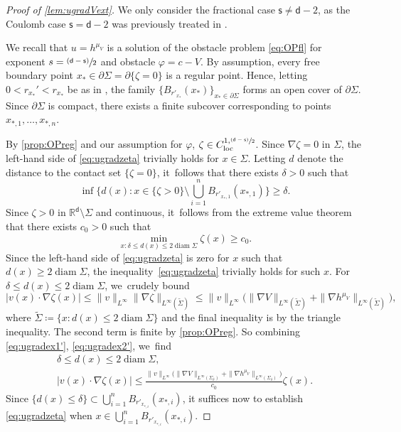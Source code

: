 \documentclass[JEP,XML,SOM,Unicode,published]{cedram}
\newcommand{\psfrac}[2]{\sfrac{(#1)}{#2}}
\newcommand{\loc}{\textup{loc}}
\theoremstyle{plain}
\theoremstyle{definition}
\DeclareMathOperator{\diam}{diam}
\newcommand{\R}{{\mathbb{R}}}
\let\nab\nabla
\let\p\partial
\let\tl\tilde
\renewcommand{\d}{\mathsf{d}}
\newcommand{\s}{\mathsf{s}}
\begin{document}
\begin{proof}[Proof of \cref{lem:ugradVext}]
We only consider the fractional case $\s\ne \d-2$, as the Coulomb case $\s=\d-2$ was previously treated in \cite[Lem.\,3.2]{BCGM2015}.

We recall that $u=h^{\mu_V}$ is a solution of the obstacle problem \eqref{eq:OPfl} for exponent ${s}=\psfrac{\d-\s}{2}$ and obstacle $\varphi=c-V$. By assumption, every free boundary point $x_*\in \p\Sigma = \p\{\zeta =0\}$ is a regular point. Hence, letting $0<r_{x_*}' < r_{x_*}$ be as in , the family $\{B_{r'_{x_*}}(x_*)\}_{x_*\in \p\Sigma}$ forms an open cover of $\p\Sigma$. Since $\p\Sigma$ is compact, there exists a finite subcover corresponding to points $x_{*,1},\ldots,x_{*,n}$.

By \cref{prop:OPreg} and our assumption for $\varphi$, $\zeta\in C_{\loc}^{1,\psfrac{\d-\s}{2}}$. Since $\nab\zeta = 0$ in $\Sigma$, the left-hand side of \eqref{eq:ugradzeta} trivially holds for $x\in\Sigma$. Letting $d$ denote the distance to the contact set $\{\zeta =0\}$, it~follows that there exists $\delta>0$ such that
\[\textstyle
\inf\bigl\{ d(x) : x \in \{\zeta > 0\} \setminus \bigcup_{i=1}^n B_{r'_{x_*,1}}(x_{*,1})\bigr\} \ge \delta.
\]
Since $\zeta>0$ in $\R^\d\setminus\Sigma$ and continuous, it~follows from the extreme value theorem that there exists $c_0>0$ such that
\begin{equation}\label{eq:ugradex1'}
\min_{x : \delta \le d(x) \le 2\diam\Sigma} \zeta(x) \ge c_0.
\end{equation}
Since the left-hand side of \eqref{eq:ugradzeta} is zero for $x$ such that $d(x)\ge 2\diam\Sigma$, the inequality~\eqref{eq:ugradzeta} trivially holds for such $x$. For {$\delta\le d(x)\le 2\diam \Sigma$}, we~crudely bound
\begin{equation}\label{eq:ugradex2'}
|v(x)\cdot \nab\zeta(x)|\le \|v\|_{L^\infty}\|\nab\zeta\|_{L^\infty(\tl\Sigma)} \le \|v\|_{L^\infty}\Big(\|\nab V\|_{L^\infty(\tl\Sigma)} + \|\nab h^{\mu_V}\|_{L^\infty(\tl\Sigma)}\Big),
\end{equation}
where {$\tl\Sigma \coloneqq \{x: d(x)\le 2\diam\Sigma\}$ and the final inequality is by the triangle inequality}. The second term is finite by \cref{prop:OPreg}. So combining \eqref{eq:ugradex1'}, \eqref{eq:ugradex2'}, we~find
\begin{equation}\label{eq:ugradex3'}
\begin{gathered}
\delta\le d(x)\le 2\diam\Sigma, \\
|v(x)\cdot\nab\zeta(x)| \le \frac{\|v\|_{L^\infty}\Big(\|\nab V\|_{L^\infty(\Sigma_\delta)} + \|\nab h^{\mu_V}\|_{L^\infty(\Sigma_\delta)}\Big)}{c_0} \zeta(x).
\end{gathered}
\end{equation}
{Since $\{d(x)\le\delta\} \subset \bigcup_{i=1}^n B_{r'_{x_{*,i}}}(x_{*,i})$,} it suffices now to establish \eqref{eq:ugradzeta} when $x\in \bigcup_{i=1}^n B_{r'_{x_{*,i}}}(x_{*,i})$.


\end{proof}
\end{document}
